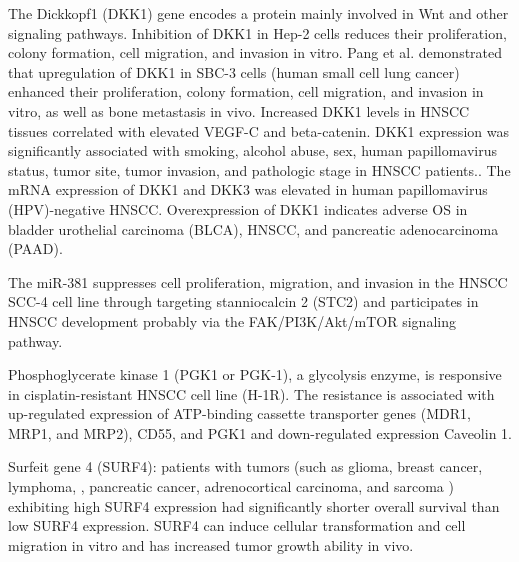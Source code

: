 \documentclass[preprint,12pt]{elsarticle}
\newenvironment{MyColorPar}[1]{%
    \leavevmode\color{#1}\ignorespaces%
}{%
}%
\begin{document}
\begin{MyColorPar}{blue}
The Dickkopf1 (DKK1) gene encodes a protein mainly involved in Wnt and other signaling pathways.
Inhibition of DKK1 in Hep-2 cells reduces their proliferation, colony formation, cell migration, and invasion in vitro\cite{Shi2014}. %
Pang et al.\cite{Pang2018} demonstrated that upregulation of DKK1 in SBC-3 cells (human small cell lung cancer) enhanced their proliferation, colony formation, cell migration, and invasion in vitro, as well as bone metastasis in vivo. 
Increased DKK1 levels in HNSCC tissues correlated with elevated VEGF-C and beta-catenin\cite{Shi2014}.
DKK1 expression was significantly associated with smoking, alcohol abuse, sex, human papillomavirus status\cite{Chakraborty2020}, tumor site, tumor invasion, and pathologic stage in HNSCC patients.\cite{Gao2018}.
The mRNA expression of DKK1 and DKK3 was elevated in human papillomavirus (HPV)-negative HNSCC\cite{Hu2020}. Overexpression of DKK1 indicates adverse OS in bladder urothelial carcinoma (BLCA)\cite{Wei2020}, HNSCC\cite{Chakraborty2020}\cite{Hu2020}\cite{Wei2020}, and pancreatic adenocarcinoma (PAAD)\cite{Wei2020}. %


The miR-381 suppresses cell proliferation, migration, and invasion in the HNSCC SCC-4 cell line through targeting stanniocalcin 2 (STC2) and participates in HNSCC development probably via the FAK/PI3K/Akt/mTOR signaling pathway.\cite{Ma2020}

Phosphoglycerate kinase 1 (PGK1 or PGK-1), a glycolysis enzyme, is responsive in cisplatin-resistant HNSCC cell line (H-1R). The resistance is associated with up-regulated expression of ATP-binding cassette transporter genes (MDR1, MRP1, and MRP2), CD55, and PGK1 and down-regulated expression Caveolin 1\cite{Nakamura2005}.

Surfeit gene 4 (SURF4): patients with tumors (such as glioma, breast cancer, lymphoma, , pancreatic cancer, adrenocortical carcinoma, and sarcoma%
) exhibiting high SURF4 expression had significantly shorter overall survival than low SURF4 expression. SURF4 can induce cellular transformation and cell migration in vitro and has increased tumor growth ability in vivo\cite{Kim2018a}.


\end{MyColorPar}
\end{document}
